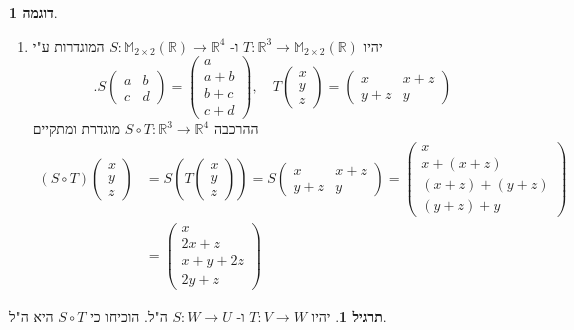 \documentclass[12pt]{report}
\theoremstyle{plain}
\theoremstyle{definition}
\newtheorem{example}{דוגמה}[chapter]
\newtheorem{exercise}{תרגיל}[chapter]
\newcommand{\R}{\mathbb{R}}
\newcommand{\M}{\mathbb{M}}
\newcommand{\0}{\mathbf{0}}
\begin{document}
\begin{example}
\begin{enumerate}[label=\alph*.]
\item
יהיו
$T:\R^3\to\M_{2\times 2}(\R)$
ו-
$S:\M_{2\times 2}(\R)\to \R^4$
המוגדרות ע"י
$$
.S\begin{pmatrix}
a & b \\
c & d
\end{pmatrix}=\begin{pmatrix}a\\a+b\\b+c\\c+d\end{pmatrix},\quad T\begin{pmatrix}x\\y\\z\end{pmatrix}=\begin{pmatrix}
x & x+z \\
y+z & y
\end{pmatrix}
$$
ההרכבה 
$S\circ T:\R^3\to\R^4$
מוגדרת ומתקיים
$$
\begin{aligned}
(S\circ T)\begin{pmatrix}x\\y\\z\end{pmatrix}&=S\left(T\begin{pmatrix}x\\y\\z\end{pmatrix}\right)=S\begin{pmatrix}
x & x+z \\
y+z & y
\end{pmatrix}=\begin{pmatrix}x\\x+(x+z)\\(x+z)+(y+z)\\(y+z)+y\end{pmatrix} \\
&=\begin{pmatrix}x\\2x+z\\x+y+2z\\2y+z\end{pmatrix}
\end{aligned}
$$


\end{enumerate}
\end{example}

\begin{exercise}
יהיו
$T:V\to W$
ו-
$S:W\to U$
ה"ל. הוכיחו כי
$S\circ T$
היא ה"ל.
\end{exercise}
\end{document}
